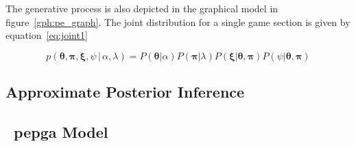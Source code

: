 
The generative process is also depicted in the graphical model in figure~\ref{gph:pe_graph}. The joint distribution for a single game section is given by equation~\ref{eq:joint1}

\begin{equation}
p(\boldsymbol\theta, \boldsymbol\pi, \boldsymbol\xi, \psi \, | \, \alpha, \lambda) = P(\boldsymbol\theta|\alpha) P(\boldsymbol\pi|\lambda)P(\boldsymbol\xi|\boldsymbol\theta, \boldsymbol\pi)P(\psi|\boldsymbol\theta, \boldsymbol\pi)
\label{eq:joint1}
\end{equation}



\subsection{Approximate Posterior Inference}




\subsection{~\glsdesc{pepga} Model}



